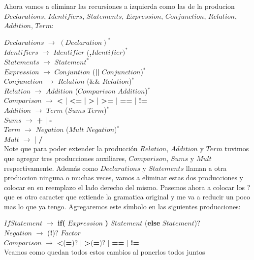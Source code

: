 Ahora vamos a eliminar las recursiones a izquierda como las de la producion $Declarations$, $Identifiers$, $Statements$, $Expression$, $Conjunction$, $Relation$, $Addition$, $Term$:

\noindent$Declarations$ $\rightarrow$ $(Declaration)^{*}$\\
$Identifiers$ $\rightarrow$ $Identifier$ ({\bf ,}$Identifier)^{*}$\\
$Statements$ $\rightarrow$ $Statement^{*}$\\
$Expression$ $\rightarrow$ $Conjuntion$ ({\bf ||} $Conjunction$)$^{*}$\\
$Conjunction$ $\rightarrow$ $Relation$ (\&\& $Relation$)$^{*}$\\
$Relation$ $\rightarrow$ $Addition$ ($Comparison$ $Addition$)$^{*}$\\
$Comparison$ $\rightarrow$ {\bf <} | {\bf <=} | {\bf >} | {\bf >=} | {\bf ==} | {\bf !=}\\
$Addition$ $\rightarrow$  $Term$ ($Sums$ $Term$)$^{*}$\\
$Sums$ $\rightarrow$ {\bf +} | {\bf -}\\
$Term$ $\rightarrow$ $Negation$ ($Mult$ $Negation$)$^{*}$\\
$Mult$ $\rightarrow$ {\bf *} | {\bf /}\\

Note que para poder extender la producción $Relation$, $Addition$ y $Term$ tuvimos que agregar tres producciones auxiliares, $Comparison$, $Sums$ y $Mult$ respectivamente. Además como $Declarations$ y $Statements$ llaman a otra produccion ninguna o muchas veces, vamos a eliminar estas dos producciones y colocar en su reemplazo el lado derecho del mismo.
Pasemos ahora a colocar los $?$ que es otro caracter que extiende la gramatica original y me va a reducir un poco mas lo que ya tengo. Agregaremos este símbolo en las siguientes producciones:

\noindent$IfStatement$ $\rightarrow$ {\bf if(} $Expression$ {\bf )} $Statement$ ({\bf else} $Statement$)$?$\\
$Negation$ $\rightarrow$ ({\bf !})$?$ $Factor$\\
$Comparison$ $\rightarrow$ {\bf <}({\bf =})$?$ | {\bf >}({\bf =})$?$  | {\bf ==} | {\bf !=}\\


Veamos como quedan todos estos cambios al ponerlos todos juntos

